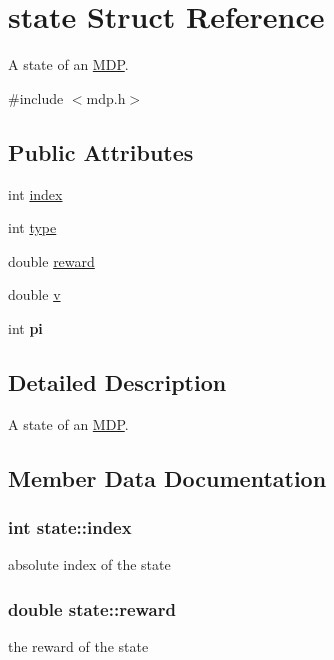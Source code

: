 \hypertarget{structstate}{}\section{state Struct Reference}
\label{structstate}


A state of an \hyperlink{structMDP}{M\+DP}.  




{\ttfamily \#include $<$mdp.\+h$>$}

\subsection*{Public Attributes}
\begin{DoxyCompactItemize}
\item 
int \hyperlink{structstate_a3710ff75625cc669e86b54029bb944bb}{index}
\item 
int \hyperlink{structstate_a8f960cbbf1b94dee7dc6cf2fe3b5c4c4}{type}
\item 
double \hyperlink{structstate_a85824245323f64d592c3aa55a409552b}{reward}
\item 
double \hyperlink{structstate_ac3c8aa16b56a2a479a78906a4f730786}{v}
\item 
int {\bfseries pi}\hypertarget{structstate_a4ef7ae44501808f1bffaa3290ed74ee7}{}\label{structstate_a4ef7ae44501808f1bffaa3290ed74ee7}

\end{DoxyCompactItemize}


\subsection{Detailed Description}
A state of an \hyperlink{structMDP}{M\+DP}. 

\subsection{Member Data Documentation}
\subsubsection[{\texorpdfstring{index}{index}}]{\setlength{\rightskip}{0pt plus 5cm}int state\+::index}\hypertarget{structstate_a3710ff75625cc669e86b54029bb944bb}{}\label{structstate_a3710ff75625cc669e86b54029bb944bb}
absolute index of the state 
\subsubsection[{\texorpdfstring{reward}{reward}}]{\setlength{\rightskip}{0pt plus 5cm}double state\+::reward}\hypertarget{structstate_a85824245323f64d592c3aa55a409552b}{}\label{structstate_a85824245323f64d592c3aa55a409552b}
the reward of the state 
